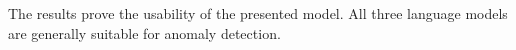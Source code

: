 The results prove the usability of the presented model. All three language models are generally suitable for anomaly detection.





